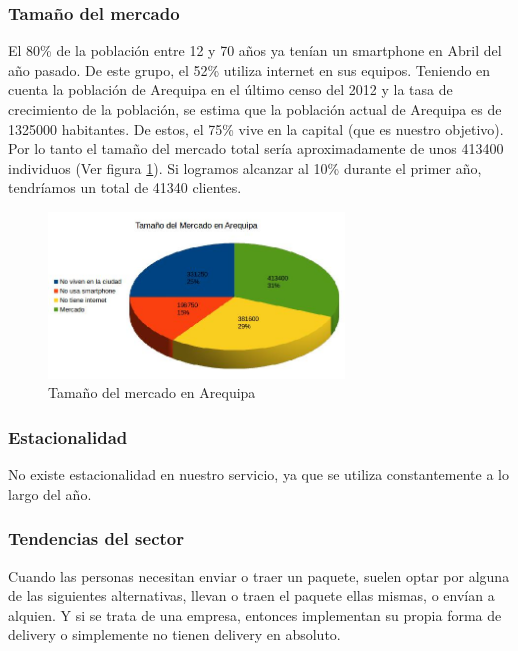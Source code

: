 \subsubsection{Tamaño del mercado}
El 80\% de la población entre 12 y 70 años ya tenían un smartphone en Abril del año pasado. De este grupo, el 52\% utiliza internet en sus equipos. Teniendo en cuenta la población de Arequipa en el último censo del 2012 y la tasa de crecimiento de la población, se estima que la población actual de Arequipa es de 1325000 habitantes. De estos, el 75\% vive en la capital (que es nuestro objetivo). Por lo tanto el tamaño del mercado total sería aproximadamente de unos 413400 individuos (Ver figura \ref{fig:mercado}). Si logramos alcanzar al 10\% durante el primer año, tendríamos un total de 41340 clientes.

\begin{figure}
  \centering
   \includegraphics[width=0.7\textwidth]{img/mercado.jpg} 
  \caption{Tamaño del mercado en Arequipa}
  \label{fig:mercado}
\end{figure}


\subsubsection{Estacionalidad}
No existe estacionalidad en nuestro servicio, ya que se utiliza constantemente a lo largo del año.

\subsubsection{Tendencias del sector}
Cuando las personas necesitan enviar o traer un paquete, suelen optar por alguna de las siguientes alternativas, llevan o traen el paquete ellas mismas, o envían a alquien. Y si se trata de una empresa, entonces implementan su propia forma de delivery o simplemente no tienen delivery en absoluto.


